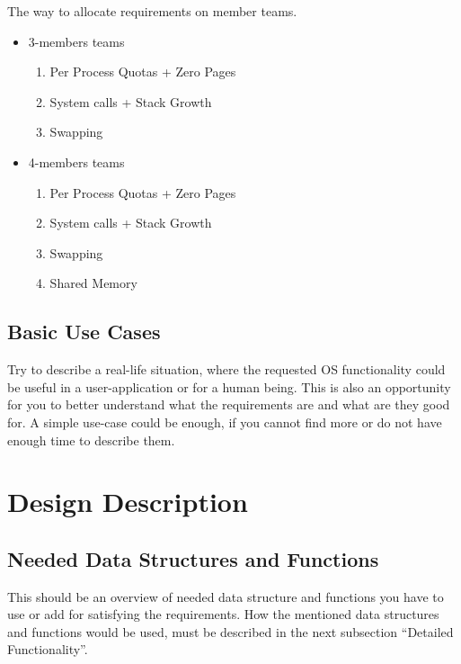 The way to allocate requirements on member teams. 
\begin{itemize}
    \item 3-members teams
        \begin{enumerate}
            \item Per Process Quotas + Zero Pages
            \item System calls + Stack Growth
            \item Swapping
        \end{enumerate}
\end{itemize}

\begin{itemize}
    \item 4-members teams
        \begin{enumerate}
            \item Per Process Quotas + Zero Pages
            \item System calls + Stack Growth
            \item Swapping
            \item Shared Memory
        \end{enumerate}
\end{itemize}

\subsection{Basic Use Cases}

Try to describe a real-life situation, where the requested OS functionality could be useful in a user-application or for a human being. This is also an opportunity for you to better understand what the requirements are and what are they good for. A simple use-case could be enough, if you cannot find more or do not have enough time to describe them.


\section{Design Description}

\subsection{Needed Data Structures and Functions}

This should be an overview of needed data structure and functions you have to use or add for satisfying the requirements. How the mentioned data structures and functions would be used, must be described in the next subsection ``Detailed Functionality''.

